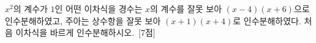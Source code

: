 $x^2$의 계수가 $1$인 어떤 이차식을 경수는 $x$의 계수를 잘못 보아 $(x-4)(x+6)$으로 인수분해하였고, 주아는 상수항을 잘못 보아 $(x+1)(x+4)$로 인수분해하였다. 처음 이차식을 바르게 인수분해하시오.~\mbox{\mbox{[7점]}}
